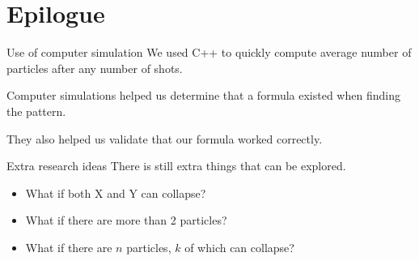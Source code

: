\documentclass[xcolor={usenames,dvipsnames}]{beamer}
\begin{document}
\section{Epilogue}
\begin{frame}{Use of computer simulation}
  We used C++ to quickly compute average number of particles after any number of shots.

  Computer simulations helped us determine that a formula existed when finding the pattern.

  They also helped us validate that our formula worked correctly.
\end{frame}
\begin{frame}{Extra research ideas}
  There is still extra things that can be explored.
  \begin{itemize}
    \item What if both X and Y can collapse?
    \item What if there are more than 2 particles?
    \item What if there are $n$ particles, $k$ of which can collapse?
  \end{itemize}
\end{frame}
\end{document}
